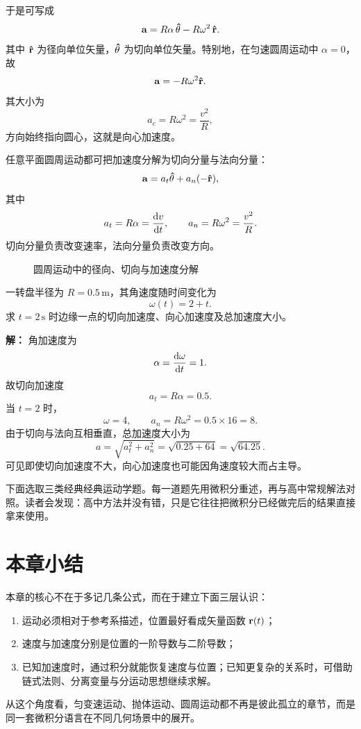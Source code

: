 于是可写成
\[
\vb{a}=R\alpha\,\vu{\theta}-R\omega^2\,\vu{r}.
\]
其中 $\vu{r}$ 为径向单位矢量，$\vu{\theta}$ 为切向单位矢量。特别地，在匀速圆周运动中 $\alpha=0$，故
\[
\vb{a}=-R\omega^2\vu{r}.
\]
其大小为
\[
 a_c=R\omega^2=\frac{v^2}{R},
\]
方向始终指向圆心，这就是向心加速度。

\begin{theorem}[圆周运动加速度分解]
任意平面圆周运动都可把加速度分解为切向分量与法向分量：
\[
\vb{a}=a_t\vu{\theta}+a_n(-\vu{r}),
\]
其中
\[
 a_t=R\alpha=\dv{v}{t},
\qquad
 a_n=R\omega^2=\frac{v^2}{R}.
\]
切向分量负责改变速率，法向分量负责改变方向。
\end{theorem}

\begin{figure}[H]
\centering
{}
\caption{圆周运动中的径向、切向与加速度分解}
\end{figure}

\begin{example}[转盘边缘上一点的加速度]
一转盘半径为 $R=0.5\,\text{m}$，其角速度随时间变化为
\[
 \omega(t)=2+t.
\]
求 $t=2\,\text{s}$ 时边缘一点的切向加速度、向心加速度及总加速度大小。

\textbf{解：}
角加速度为
\[
 \alpha=\dv{\omega}{t}=1.
\]
故切向加速度
\[
 a_t=R\alpha=0.5.
\]
当 $t=2$ 时，
\[
 \omega=4,
\qquad
 a_n=R\omega^2=0.5\times 16=8.
\]
由于切向与法向互相垂直，总加速度大小为
\[
 a=\sqrt{a_t^2+a_n^2}=\sqrt{0.25+64}=\sqrt{64.25}.
\]
可见即使切向加速度不大，向心加速度也可能因角速度较大而占主导。
\end{example}

下面选取三类经典经典运动学题。每一道题先用微积分重述，再与高中常规解法对照。读者会发现：高中方法并没有错，只是它往往把微积分已经做完后的结果直接拿来使用。

\section{本章小结}

本章的核心不在于多记几条公式，而在于建立下面三层认识：
\begin{enumerate}
  \item 运动必须相对于参考系描述，位置最好看成矢量函数 $\vb{r}(t)$；
  \item 速度与加速度分别是位置的一阶导数与二阶导数；
  \item 已知加速度时，通过积分就能恢复速度与位置；已知更复杂的关系时，可借助链式法则、分离变量与分运动思想继续求解。
\end{enumerate}

从这个角度看，匀变速运动、抛体运动、圆周运动都不再是彼此孤立的章节，而是同一套微积分语言在不同几何场景中的展开。

